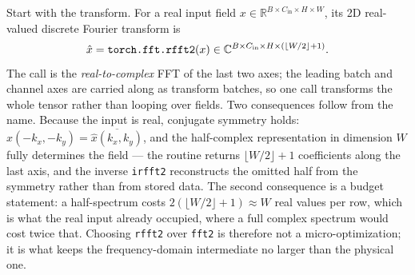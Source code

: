 Start with the transform. For a real input field
$x \in \mathbb{R}^{B \times C_{\text{in}} \times H \times W}$, its 2D
real-valued discrete Fourier transform is
\begin{equation}
  \label{eq:ch23-rfft2}
  \hat{x} = \text{\texttt{torch.fft.rfft2}}(x) \in \mathbb{C}^{B \times C_{\text{in}} \times H \times (\lfloor W/2 \rfloor + 1)}.
\end{equation}
The call is the \emph{real-to-complex} FFT of the last two axes; the leading
batch and channel axes are carried along as transform batches, so one call
transforms the whole tensor rather than looping over fields. Two consequences
follow from the name. Because the input is real, conjugate symmetry holds:
$\hat{x}(-k_x, -k_y) = \overline{\hat{x}(k_x, k_y)}$, and the half-complex
representation in dimension $W$ fully determines the field --- the routine
returns $\lfloor W/2 \rfloor + 1$ coefficients along the last axis, and the
inverse \texttt{irfft2} reconstructs the omitted half from the symmetry rather
than from stored data. The second consequence is a budget
statement: a half-spectrum costs $2(\lfloor W/2 \rfloor + 1) \approx W$ real
values per row, which is what the real input already occupied, where a full
complex spectrum would cost twice that. Choosing \texttt{rfft2} over
\texttt{fft2} is therefore not a micro-optimization; it is what keeps the
frequency-domain intermediate no larger than the physical one.

